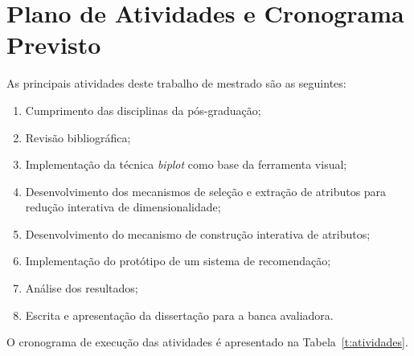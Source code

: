 \clearpage

\section{Plano de Atividades e Cronograma Previsto}\label{sec:cronograma}

As principais atividades deste trabalho de mestrado são as seguintes:

\begin{enumerate}
    \item Cumprimento das disciplinas da pós-graduação;

    \item Revisão bibliográfica;

    \item Implementação da técnica \emph{biplot} como base da
        ferramenta visual;

    \item Desenvolvimento dos mecanismos de seleção e
        extração de atributos para redução interativa de
        dimensionalidade;

    \item Desenvolvimento do mecanismo de construção
        interativa de atributos;

    \item Implementação do protótipo de um sistema de
        recomendação;

    \item Análise dos resultados;

    \item Escrita e apresentação da dissertação para a banca
        avaliadora. 
\end{enumerate}

O cronograma de execução das atividades é apresentado na Tabela~\ref{t:atividades}. 

\newcommand{\y}{\color{black}\rule{35pt}{7pt}}
\newcommand{\x}{\hspace*{35pt}}
\renewcommand{\r}{\color{cinza}\rule{35pt}{7pt}}
\setlength{\tabcolsep}{0pt}

